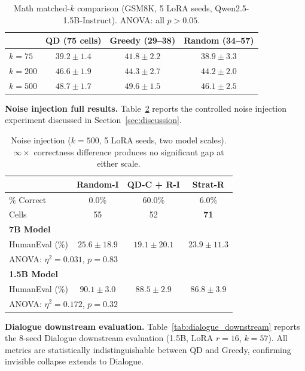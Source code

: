 \documentclass{article}
\theoremstyle{plain}
\theoremstyle{remark}
\begin{document}
\begin{table}[h]
\centering
\caption{Math matched-$k$ comparison (GSM8K, 5 LoRA seeds, Qwen2.5-1.5B-Instruct). ANOVA: all $p{>}0.05$.}
\label{tab:math_matched_k}
\begin{tabular}{lccc}
\toprule
 & \textbf{QD (75 cells)} & \textbf{Greedy (29--38)} & \textbf{Random (34--57)} \\
\midrule
$k{=}75$ & $39.2 \pm 1.4$ & $41.8 \pm 2.2$ & $38.9 \pm 3.3$ \\
$k{=}200$ & $\mathbf{46.6 \pm 1.9}$ & $44.3 \pm 2.7$ & $44.2 \pm 2.0$ \\
$k{=}500$ & $48.7 \pm 1.7$ & $\mathbf{49.6 \pm 1.5}$ & $46.1 \pm 2.5$ \\
\bottomrule
\end{tabular}
\end{table}

\textbf{Noise injection full results.}
Table~\ref{tab:noise} reports the controlled noise injection experiment discussed in Section~\ref{sec:discussion}.

\begin{table}[h]
\centering
\caption{Noise injection ($k{=}500$, 5 LoRA seeds, two model scales). $\infty\times$ correctness difference produces no significant gap at either scale.}
\label{tab:noise}
\begin{tabular}{lccc}
\toprule
 & \textbf{Random-I} & \textbf{QD-C + R-I} & \textbf{Strat-R} \\
\midrule
\% Correct & 0.0\% & 60.0\% & 6.0\% \\
Cells & 55 & 52 & \textbf{71} \\
\midrule
\multicolumn{4}{l}{\textbf{7B Model}} \\
HumanEval (\%) & $25.6 \pm 18.9$ & $19.1 \pm 20.1$ & $23.9 \pm \mathbf{11.3}$ \\
\multicolumn{4}{l}{\footnotesize ANOVA: $\eta^2{=}0.031$, $p{=}0.83$} \\
\midrule
\multicolumn{4}{l}{\textbf{1.5B Model}} \\
HumanEval (\%) & $90.1 \pm \mathbf{3.0}$ & $88.5 \pm 2.9$ & $86.8 \pm 3.9$ \\
\multicolumn{4}{l}{\footnotesize ANOVA: $\eta^2{=}0.172$, $p{=}0.32$} \\
\bottomrule
\end{tabular}
\end{table}

\textbf{Dialogue downstream evaluation.}
Table~\ref{tab:dialogue_downstream} reports the 8-seed Dialogue downstream evaluation (1.5B, LoRA $r{=}16$, $k{=}57$). All metrics are statistically indistinguishable between QD and Greedy, confirming invisible collapse extends to Dialogue.
\end{document}
